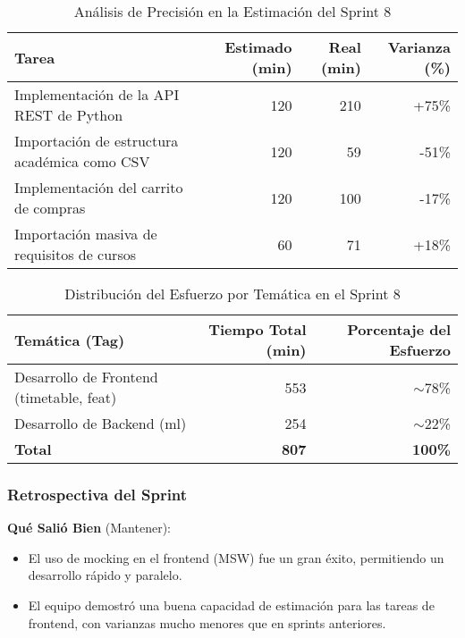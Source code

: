 \begin{table}[H]
    \caption{Análisis de Precisión en la Estimación del Sprint 8}
    \label{tab:sprint-8-estimation-accuracy}
    \begin{tabularx}{\textwidth}{@{}Xrrr@{}}
        \toprule
        \textbf{Tarea} & \textbf{Estimado (min)} & \textbf{Real (min)} & \textbf{Varianza (\%)} \\
        \midrule
        Implementación de la API REST de Python & 120 & 210 & +75\% \\
        Importación de estructura académica como CSV & 120 & 59 & -51\% \\
        Implementación del carrito de compras & 120 & 100 & -17\% \\
        Importación masiva de requisitos de cursos & 60 & 71 & +18\% \\
        \bottomrule
    \end{tabularx}
\end{table}

\begin{table}[H]
    \caption{Distribución del Esfuerzo por Temática en el Sprint 8}
    \label{tab:sprint-8-effort-distribution}
    \begin{tabularx}{\textwidth}{@{}Xrr@{}}
        \toprule
        \textbf{Temática (Tag)} & \textbf{Tiempo Total (min)} & \textbf{Porcentaje del Esfuerzo} \\
        \midrule
        Desarrollo de Frontend (timetable, feat) & 553 & $\sim$78\% \\
        Desarrollo de Backend (ml) & 254 & $\sim$22\% \\
        \midrule
        \textbf{Total} & \textbf{807} & \textbf{100\%} \\
        \bottomrule
    \end{tabularx}
\end{table}

\subsubsection{Retrospectiva del Sprint}

\textbf{Qué Salió Bien} (Mantener):
\begin{itemize}
    \item El uso de mocking en el frontend (MSW) fue un gran éxito, permitiendo un desarrollo rápido y paralelo.
    \item El equipo demostró una buena capacidad de estimación para las tareas de frontend, con varianzas mucho menores que en sprints anteriores.
\end{itemize}

